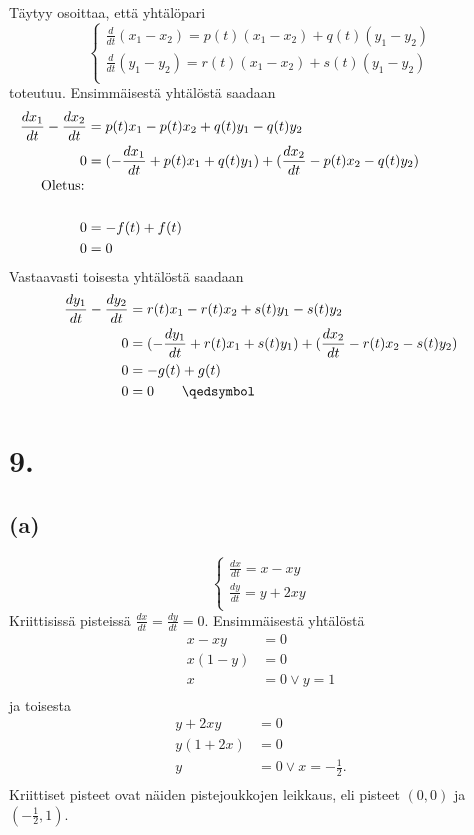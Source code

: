 \documentclass{article}
\begin{document}
Täytyy osoittaa, että yhtälöpari
\[
  \begin{cases}
    \frac{d}{dt}(x_1 - x_2) = p(t)(x_1 - x_2) + q(t)(y_1 - y_2) \\
    \frac{d}{dt}(y_1 - y_2) = r(t)(x_1 - x_2) + s(t)(y_1 - y_2) \\
  \end{cases}
\]
toteutuu. Ensimmäisestä yhtälöstä saadaan
\begin{align*}
  \frac{dx_1}{dt} - \frac{dx_2}{dt} &= p(t)x_1 - p(t)x_2 + q(t)y_1 - q(t)y_2 \\
  0 &= (-\frac{dx_1}{dt} + p(t)x_1 + q(t)y_1) + (\frac{dx_2}{dt} - p(t)x_2 - q(t)y_2) \\
  \noalign{\text{Oletus:}} \\
  0 &= -f(t) + f(t) \\
  0 &= 0 \\
\end{align*}
Vastaavasti toisesta yhtälöstä saadaan
\begin{align*}
  \frac{dy_1}{dt} - \frac{dy_2}{dt} &= r(t)x_1 - r(t)x_2 + s(t)y_1 - s(t)y_2 \\
  0 &= (-\frac{dy_1}{dt} + r(t)x_1 + s(t)y_1) + (\frac{dx_2}{dt} - r(t)x_2 - s(t)y_2) \\
  0 &= -g(t) + g(t) \\
  0 &= 0 \qquad \qedsymbol \\
\end{align*}

\section*{9.}

\subsection*{(a)}

\[
  \begin{cases}
    \frac{dx}{dt} = x - xy \\
    \frac{dy}{dt} = y + 2xy \\
  \end{cases}
\]
Kriittisissä pisteissä $\frac{dx}{dt} = \frac{dy}{dt} = 0$.
Ensimmäisestä yhtälöstä
\begin{align*}
  x - xy &= 0 \\
  x(1 - y) &= 0 \\
  x &= 0 \vee y = 1 \\
\end{align*}
ja toisesta
\begin{align*}
  y + 2xy &= 0 \\
  y(1 + 2x) &= 0 \\
  y &= 0 \vee x = -\frac{1}{2}. \\
\end{align*}
Kriittiset pisteet ovat näiden pistejoukkojen leikkaus, eli pisteet
$(0, 0)$ ja $(-\frac{1}{2}, 1)$.
\end{document}
